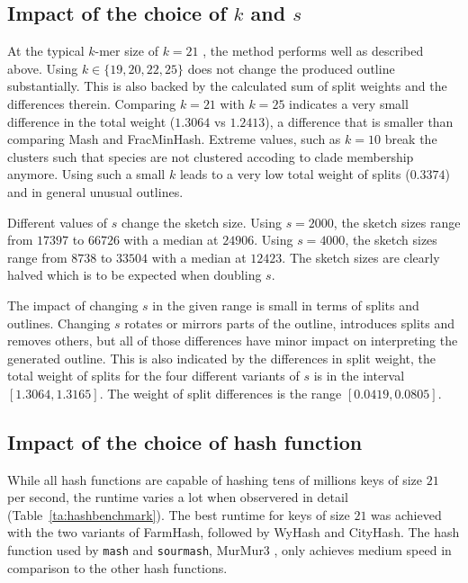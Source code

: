 \subsection*{Impact of the choice of $k$ and $s$}
At the typical $k$-mer size of $k=21$
\cite{mandalComparativeGenomeAnalysis2022,ondovMashFastGenome2016,irberLightweightCompositionalAnalysis2022},
the method performs well as described above. Using $k \in \{19, 20, 22, 25\}$
does not change the produced outline substantially. This is also backed by the
calculated sum of split weights and the differences therein. Comparing $k=21$
with $k=25$ indicates a very small difference in the total weight ($1.3064$ vs
$1.2413$), a difference that is smaller than comparing Mash and FracMinHash.
Extreme values, such as $k=10$ break the clusters such that species are not
clustered accoding to clade membership anymore. Using such a small $k$ leads to
a very low total weight of splits ($0.3374$) and in general unusual outlines.

Different values of $s$ change the sketch size. Using $s=2000$, the sketch sizes
range from $17397$ to $66726$ with a median at $24906$. Using $s=4000$, the
sketch sizes range from $8738$ to $33504$ with a median at $12423$. The sketch
sizes are clearly halved which is to be expected when doubling $s$.

The impact of changing $s$ in the given range is small in terms of splits and
outlines. Changing $s$ rotates or mirrors parts of the outline, introduces
splits and removes others, but all of those differences have minor impact on
interpreting the generated outline. This is also indicated by the differences in
split weight, the total weight of splits for the four different variants of $s$
is in the interval $[1.3064, 1.3165]$. The weight of split differences is the
range $[0.0419, 0.0805]$.

\subsection*{Impact of the choice of hash function}
While all hash functions are capable of hashing tens of millions keys of size
$21$ per second, the runtime varies a lot when observered in detail
(Table~\ref{ta:hashbenchmark}). The best runtime for keys of size $21$ was
achieved with the two variants of FarmHash, followed by WyHash and CityHash. The
hash function used by \texttt{mash} and \texttt{sourmash}, MurMur3
\cite{ondovMashFastGenome2016,irberLightweightCompositionalAnalysis2022}, only
achieves medium speed in comparison to the other hash functions.  

